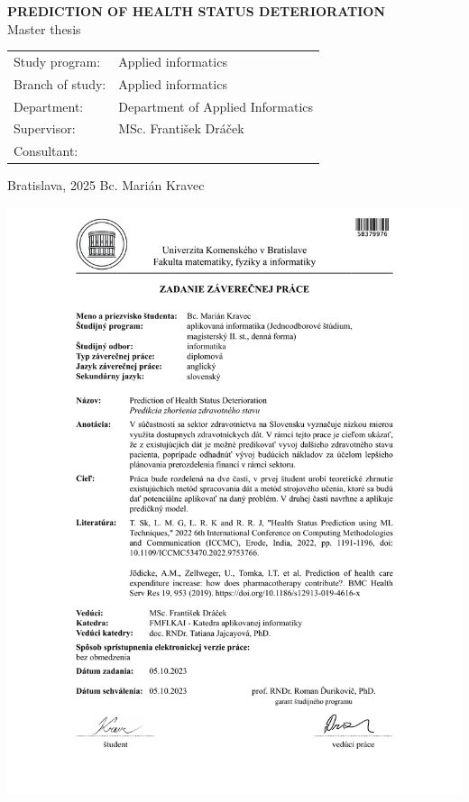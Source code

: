 \documentclass[12pt, twoside, openany]{book}
\def\mftitle{Prediction of health status deterioration} %
\def\mfthesistype{Master thesis}
\def\mfauthor{Bc. Marián Kravec}
\def\mfskolitel{MSc. František Dráček}
\def\mfkonzultant{}
\def\mfplacedate{Bratislava, 2025}
\def\mfodbor{Applied informatics}
\def\program{Applied informatics}
\def\mfpracovisko{Department of Applied Informatics }
\begin{document}
\begin{center}
	\textbf{\MakeUppercase{\Large\mftitle}}\\
	\mfthesistype
\end{center}
\vfill


\begin{tabular}{l l}
Study program: & \program \\
Branch of study: & \mfodbor \\
Department: & \mfpracovisko \\
Supervisor: & \mfskolitel \\
Consultant: & \mfkonzultant \\
\end{tabular}

\vfill
\noindent
\mfplacedate \hfill
\mfauthor
\cleardoublepage




\newpage 
\thispagestyle{empty}
\hspace{-2cm}\includegraphics[page=1,width=1\textwidth]{add_sign.PDF}
\end{document}
